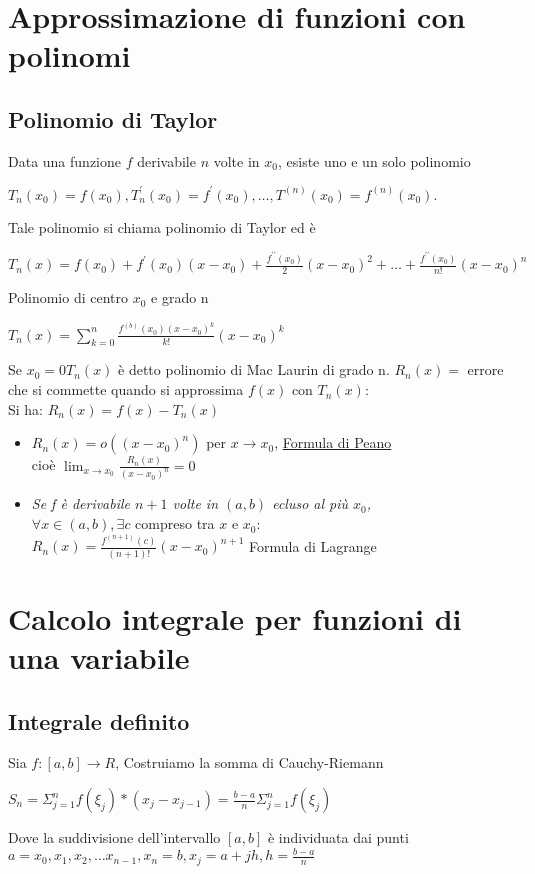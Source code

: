 \section{Approssimazione di funzioni con polinomi}
\subsection{Polinomio di Taylor}
Data una funzione $f$ derivabile $n$ volte in $x_0$, esiste uno e un solo
polinomio 
\begin{center}
	$T_n(x_0)=f(x_0),T^\prime_n(x_0)=f^\prime(x_0),\dots, T^{(n)}(x_0)=
f^{(n)}(x_0).$
\end{center}
Tale polinomio si chiama polinomio di Taylor ed è
\begin{center}
	$T_n(x)=f(x_0)+f^\prime(x_0)(x-x_0)+\frac{f^{\prime\prime}(x_0)}{2}(x-x_0)^2+\dots
	+ \frac{f^{\prime\prime}(x_0)}{n!}(x-x_0)^n$
\end{center}
Polinomio di centro $x_0$ e grado n
\begin{center}
	$T_n(x)=\sum^n_{k=0}\frac{f^{(b)}(x_0)(x-x_0)^k}{k!}(x-x_0)^k$
\end{center}
Se $x_0=0T_n(x)$ è detto polinomio di Mac Laurin di grado n. $R_n(x)=$ errore
che si commette quando si approssima $f(x)$ con $T_n(x)$:\\
Si ha: $R_n(x)=f(x)-T_n(x)$
\begin{itemize}
	\item $R_n(x)=o((x-x_0)^n)$ per $x\to x_0$, \underline{Formula di Peano}\\
		cioè $\lim_{x\to x_0}\frac{R_n(x)}{(x-x_0)^n}=0$
	\item \textit{Se f è derivabile $n+1$ volte in $(a,b)$ ecluso al più
		$x_0$,}\\
		$\forall x\in(a,b), \exists c$ compreso tra $x$ e $x_0$:\\
		$R_n(x)=\frac{f^{(n+1)}(c)}{(n+1)!}(x-x_0)^{n+1}$ Formula di Lagrange
\end{itemize}
\section{Calcolo integrale per funzioni di una variabile}
\subsection{Integrale definito}
Sia $f:[a,b]\to R$, 
Costruiamo la somma di Cauchy-Riemann
\begin{center}
	$S_n=\Sigma^n_{j=1}f(\xi_j)*(x_j-x_{j-1})=\frac{b-a}{n}\Sigma^{n}_{j=1}f(\xi_j)$
\end{center}
Dove la suddivisione dell'intervallo $[a,b]$ è individuata dai punti $a=x_0,x_1,x_2,\dots x_{n-1},x_n=b, x_j=a+jh, h=\frac{b-a}{n}$
